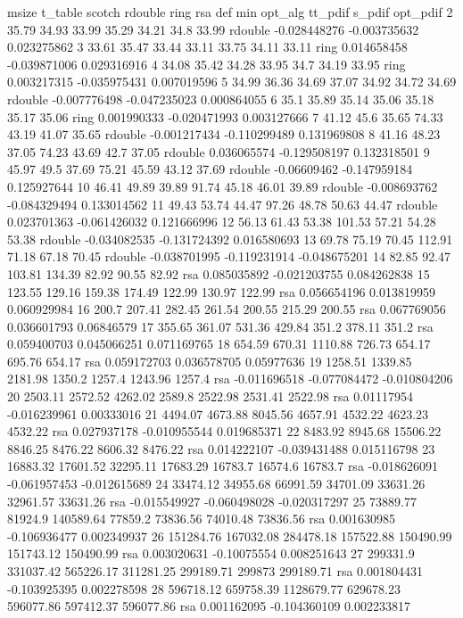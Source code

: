 msize	t_table	scotch	rdouble	ring	rsa	def	min	opt_alg	tt_pdif	s_pdif	opt_pdif
2	35.79	34.93	33.99	35.29	34.21	34.8	33.99	rdouble	-0.028448276	-0.003735632	0.023275862
3	33.61	35.47	33.44	33.11	33.75	34.11	33.11	ring	0.014658458	-0.039871006	0.029316916
4	34.08	35.42	34.28	33.95	34.7	34.19	33.95	ring	0.003217315	-0.035975431	0.007019596
5	34.99	36.36	34.69	37.07	34.92	34.72	34.69	rdouble	-0.007776498	-0.047235023	0.000864055
6	35.1	35.89	35.14	35.06	35.18	35.17	35.06	ring	0.001990333	-0.020471993	0.003127666
7	41.12	45.6	35.65	74.33	43.19	41.07	35.65	rdouble	-0.001217434	-0.110299489	0.131969808
8	41.16	48.23	37.05	74.23	43.69	42.7	37.05	rdouble	0.036065574	-0.129508197	0.132318501
9	45.97	49.5	37.69	75.21	45.59	43.12	37.69	rdouble	-0.06609462	-0.147959184	0.125927644
10	46.41	49.89	39.89	91.74	45.18	46.01	39.89	rdouble	-0.008693762	-0.084329494	0.133014562
11	49.43	53.74	44.47	97.26	48.78	50.63	44.47	rdouble	0.023701363	-0.061426032	0.121666996
12	56.13	61.43	53.38	101.53	57.21	54.28	53.38	rdouble	-0.034082535	-0.131724392	0.016580693
13	69.78	75.19	70.45	112.91	71.18	67.18	70.45	rdouble	-0.038701995	-0.119231914	-0.048675201
14	82.85	92.47	103.81	134.39	82.92	90.55	82.92	rsa	0.085035892	-0.021203755	0.084262838
15	123.55	129.16	159.38	174.49	122.99	130.97	122.99	rsa	0.056654196	0.013819959	0.060929984
16	200.7	207.41	282.45	261.54	200.55	215.29	200.55	rsa	0.067769056	0.036601793	0.06846579
17	355.65	361.07	531.36	429.84	351.2	378.11	351.2	rsa	0.059400703	0.045066251	0.071169765
18	654.59	670.31	1110.88	726.73	654.17	695.76	654.17	rsa	0.059172703	0.036578705	0.05977636
19	1258.51	1339.85	2181.98	1350.2	1257.4	1243.96	1257.4	rsa	-0.011696518	-0.077084472	-0.010804206
20	2503.11	2572.52	4262.02	2589.8	2522.98	2531.41	2522.98	rsa	0.01117954	-0.016239961	0.00333016
21	4494.07	4673.88	8045.56	4657.91	4532.22	4623.23	4532.22	rsa	0.027937178	-0.010955544	0.019685371
22	8483.92	8945.68	15506.22	8846.25	8476.22	8606.32	8476.22	rsa	0.014222107	-0.039431488	0.015116798
23	16883.32	17601.52	32295.11	17683.29	16783.7	16574.6	16783.7	rsa	-0.018626091	-0.061957453	-0.012615689
24	33474.12	34955.68	66991.59	34701.09	33631.26	32961.57	33631.26	rsa	-0.015549927	-0.060498028	-0.020317297
25	73889.77	81924.9	140589.64	77859.2	73836.56	74010.48	73836.56	rsa	0.001630985	-0.106936477	0.002349937
26	151284.76	167032.08	284478.18	157522.88	150490.99	151743.12	150490.99	rsa	0.003020631	-0.10075554	0.008251643
27	299331.9	331037.42	565226.17	311281.25	299189.71	299873	299189.71	rsa	0.001804431	-0.103925395	0.002278598
28	596718.12	659758.39	1128679.77	629678.23	596077.86	597412.37	596077.86	rsa	0.001162095	-0.104360109	0.002233817
